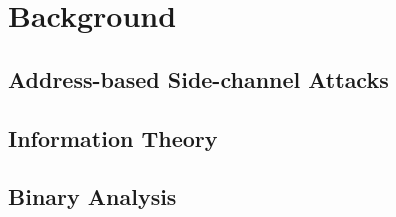 
\chapter{Background}

\section{Address-based Side-channel Attacks}

\section{Information Theory}

\section{Binary Analysis}